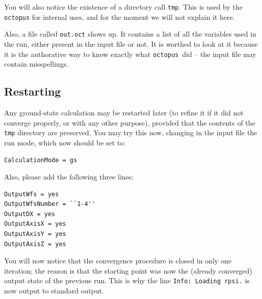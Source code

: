 \documentclass[10pt,a4paper,twoside]{article}
\newcommand{\octopus}{{\tt octopus}\ }
\begin{document}
You will also notice the existence of a directory call {\tt tmp}. This is used by
the {\tt octopus} for internal uses, and for the moment we will not explain it here.

Also, a file called {\tt out.oct} shows up. It contains a list of all the variables
used in the run, either present in the input file or not. It is worthed to look at it
because it is the authorative way to know exactly what \octopus did -- the input
file may contain misspellings.

\subsection{Restarting}

Any ground-state calculation may be restarted later (to refine it if it did not
converge properly, or with any other purpose), provided that the contents of the {\tt tmp}
directory are preserved. You may try this now, changing in the input file the run
mode, which now should be set to:

{\tt CalculationMode = gs }

Also, please add the following three lines:
\begin{verbatim}
OutputWfs = yes
OutputWfsNumber = ``1-4''
OutputDX = yes
OutputAxisX = yes
OutputAxisY = yes
OutputAxisZ = yes
\end{verbatim}

You will now notice that the convergence procedure is closed in only
one iteration; the reason is that the starting point was now
the (already converged) output state of the previous run. This
is why the line {\tt Info: Loading rpsi.} is now output to
standard output.
\end{document}
